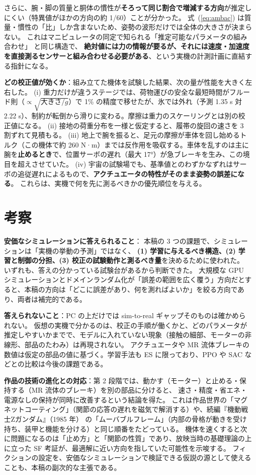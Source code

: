 \documentclass[paper=a4paper,fontsize=10pt,twocolumn,column_gap=2zw,line_length=24zw,number_of_lines=46,head_space=20mm]{jlreq}
\begin{document}
さらに、腕・脚の質量と胴体の慣性が\textbf{そろって同じ割合で増減する方向}が推定しにくい（特異値がほかの方向の約 1/60）ことが分かった。
式~(\ref{eq:ambac}) は質量・慣性の「比」しか含まないため、姿勢の波形だけでは全体の大きさが決まらない。
これはマニピュレータの同定で知られる「推定可能なパラメータの組み合わせ」\cite{gautier1990} と同じ構造で、
\textbf{絶対値には力の情報が要るが、それには速度・加速度を直接測るセンサーと組み合わせる必要がある}、という実機の計測計画に直結する指針になる。

\textbf{どの校正値が効くか}：組み立てた機体を試験した結果、次の量が性能を大きく左右した。
(i) 重力だけが違うステージでは、荷物運びの安全な最短時間がフルード則（$\propto\sqrt{\text{大きさ}/g}$）で 1\% の精度で移せたが、氷では外れ（予測 1.35 s 対 2.22 s）、制約が転倒から滑りに変わる。摩擦は重力のスケーリングとは別の校正値になる。
(ii) 接地の荷重分布を一様と仮定すると、履帯の旋回の速さを 3 割ずれて見積もる。
(iii) 地上で腕を振ると、足元の摩擦が車体を回し始めるトルク（この機体で約 260 N·m）までは反作用を吸収する。車体を乱すのは主に腕を\textbf{止めるとき}で、位置サーボの遅れ（最大 17°）が急ブレーキを生み、この境目を超えさせていた。
(iv) 宇宙の試験場でも、基準値とのわずかなずれはサーボの追従遅れによるもので、\textbf{アクチュエータの特性がそのまま姿勢の誤差になる}。
これらは、実機で何を先に測るべきかの優先順位を与える。

\section{考察}

\textbf{安価なシミュレーションに答えられること}：
本稿の 3 つの課題で、シミュレーションは「実機の挙動の予測」ではなく、
\textbf{(1) 学習に与えるべき構造、(2) 学習と制御の分担、(3) 校正の試験動作と測るべき量}を決めるために使われた。
いずれも、答えの分かっている試験台があるから判断できた。
大規模な GPU シミュレーションとドメインランダム化が「誤差の範囲を広く覆う」方向だとすると、本稿の方向は「どこに誤差があり、何を測ればよいか」を絞る方向であり、両者は補完的である。

\textbf{答えられないこと}：PC の上だけでは sim-to-real ギャップそのものは確かめられない。
仮想の実機で分かるのは、校正の手順が働くかと、どのパラメータが推定しやすいかまでで、モデルに入れていない現象（接触の細部、モーターの非線形、部品のたわみ）は再現されない。
アクチュエータや MR 流体ブレーキの数値は仮定の部品の値に基づく。学習手法も ES に限っており、PPO や SAC などとの比較は今後の課題である。

\textbf{作品の技術の進化との対応}：第 2 段階では、動かす（モーター）と止める・保持する（MR 流体のブレーキ）を別の部品に分けると、
速さ・精度・省エネ・電源なしの保持が同時に改善するという結論を得た。
これは作品世界の「マグネットコーティング」（関節の応答の遅れを磁気で解消する）や、続編『機動戦士Ζガンダム』（1985 年）\cite{zeta} の「ムーバブルフレーム」（内部の骨格が動きを受け持ち、装甲と機能を分ける）と同じ順番をたどっている。
機体を速くすると次に問題になるのは「止め方」と「関節の性質」であり、放映当時の基礎理論の上に立った SF 考証が、最適解に近い方向を指していた可能性を示唆する。
フィクションの設定を、安価なシミュレーションで検証できる仮説の源として使えることも、本稿の副次的な主張である。
\end{document}
